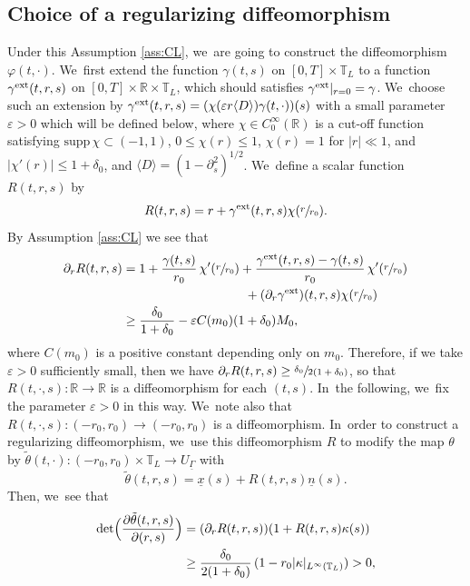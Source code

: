 \documentclass[JEP,XML,SOM,Unicode,NoFloatCountersInSection,published]{cedram}
\newcommand{\R}{{\mathbb R}}
\newcommand{\ul}[1]{\underline{#1}}
\newcommand{\itGamma}{\mathit{\Gamma}}
\theoremstyle{definition}
\begin{document}
\subsection{Choice of a regularizing diffeomorphism}\label{subsect:ChoiceD}
Under this Assumption \ref{ass:CL}, we~are going to construct the diffeomorphism $\varphi(t,\cdot)$. We~first extend the function $\gamma(t,s)$ on $[0,T]\times\mathbb{T}_L$ to a function $\gamma^{\rm ext}(t,r,s)$ on $[0,T]\times\R\times\mathbb{T}_L$,
which should satisfies $\gamma^{\rm ext}|_{r=0}=\gamma$. We~choose such an extension by $\gamma^{\rm ext}(t,r,s)=(\chi(\varepsilon r\langle D\rangle)\gamma(t,\cdot))(s)$ with a small parameter $\varepsilon>0$
which will be defined below, where $\chi \in C_0^\infty(\R)$ is a cut-off function satisfying $\mbox{supp}\,\chi \subset (-1,1)$,
$0\leq \chi(r)\leq 1$, $\chi(r)=1$ for $|r|\ll1$, and $|\chi'(r)| \leq 1+\delta_0$, and $\langle D\rangle=(1-\partial_s^2)^{1/2}$. We~define a scalar function $R(t,r,s)$ by
\[
R(t,r,s) = r + \gamma^{\rm ext}(t,r,s)\chi(\sfrac{r}{r_0}).
\]
By Assumption \ref{ass:CL} we see that
\begin{align*}
\partial_r R(t,r,s)
&= 1 + \frac{\gamma(t,s)}{r_0}\,\chi'(\sfrac{r}{r_0}) + \frac{\gamma^{\rm ext}(t,r,s)-\gamma(t,s)}{r_0}\,\chi'(\sfrac{r}{r_0})\\
&\hspace*{3.4cm}+ (\partial_r\gamma^{\rm ext})(t,r,s)\chi(\sfrac{r}{r_0}) \\
&\geq \frac{\delta_0}{1+\delta_0} - \varepsilon C(m_0)(1+\delta_0)M_0,
\end{align*}
where $C(m_0)$ is a positive constant depending only on $m_0$.
Therefore, if we take $\varepsilon>0$ sufficiently small, then we have $\partial_r R(t,r,s) \geq \sfrac{\delta_0}{2(1+\delta_0)}$,
so that $R(t,\cdot,s): \R\to\R$ is a diffeomorphism for each $(t,s)$. In~the following, we~fix the parameter $\varepsilon>0$ in this way. We~note also that $R(t,\cdot,s): (-r_0,r_0) \to (-r_0,r_0)$ is a diffeomorphism. In~order to construct a regularizing diffeomorphism, we~use this diffeomorphism $R$ to modify the map $\theta$ by
$\tilde{\theta}(t,\cdot): (-r_0,r_0)\times\mathbb{T}_L \to U_{\ul{\itGamma}}$ with
\begin{equation}\label{theta-modify}
\tilde{\theta}(t,r,s) = \ul{x}(s) + R(t,r,s)\ul{n}(s).
\end{equation}
Then, we~see that
\begin{align*}
\det\Bigl(\frac{\partial\tilde{\theta}(t,r,s)}{\partial(r,s)} \Bigr)
&= (\partial_rR(t,r,s))(1+R(t,r,s)\kappa(s)) \\
&\geq \frac{\delta_0}{2(1+\delta_0)}\,(1-r_0|\kappa|_{L^\infty(\mathbb{T}_L)})>0,
\end{align*}
\end{document}
